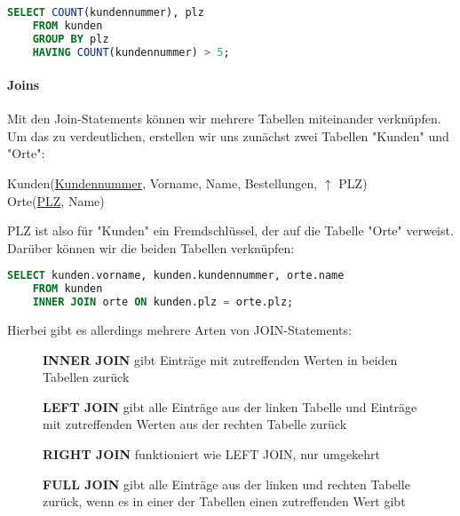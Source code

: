 \documentclass{article}
\begin{document}
	\begin{lstlisting}[language=SQL, caption=Orte mit mehr als 5 Kunden]
	SELECT COUNT(kundennummer), plz 
	FROM kunden 
	GROUP BY plz 
	HAVING COUNT(kundennummer) > 5;
	\end{lstlisting}

	\paragraph{Joins}
	Mit den Join-Statements können wir mehrere Tabellen miteinander verknüpfen. Um das zu verdeutlichen, erstellen wir uns zunächst zwei Tabellen "Kunden" und "Orte":

	\begin{center}
		Kunden(\underline{Kundennummer}, Vorname, Name, Bestellungen, $\uparrow$ PLZ) \\
		Orte(\underline{PLZ}, Name)
	\end{center}

	PLZ ist also für "Kunden" ein Fremdschlüssel, der auf die Tabelle "Orte" verweist. Darüber können wir die beiden Tabellen verknüpfen:

	\begin{lstlisting}[language=SQL, caption=Wir erhalten Vornamen sowie Kundennummern und dazugehörige Ortsnamen]
	SELECT kunden.vorname, kunden.kundennummer, orte.name
	FROM kunden
	INNER JOIN orte ON kunden.plz = orte.plz;
	\end{lstlisting}

	Hierbei gibt es allerdings mehrere Arten von JOIN-Statements:

	\begin{figure}[h!]
		\centering
		
		\caption{\textbf{INNER JOIN} gibt Einträge mit zutreffenden Werten in beiden Tabellen zurück}
	\end{figure}

	\begin{figure}[h!]
		\centering
		
		\caption{\textbf{LEFT JOIN} gibt alle Einträge aus der linken Tabelle und Einträge mit zutreffenden Werten aus der rechten Tabelle zurück}
	\end{figure}

	\begin{figure}[h!]
		\centering
		
		\caption{\textbf{RIGHT JOIN} funktioniert wie LEFT JOIN, nur umgekehrt}
	\end{figure}

	\begin{figure}[h!]
		\centering
		
		\caption{\textbf{FULL JOIN} gibt alle Einträge aus der linken und rechten Tabelle zurück, wenn es in einer der Tabellen einen zutreffenden Wert gibt}
	\end{figure}
\end{document}
